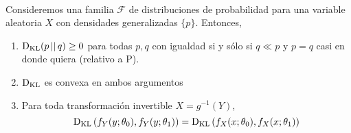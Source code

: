 \documentclass[main.tex]{subfiles}
\begin{document}
\begin{theorem} \ \\
Consideremos una familia $\mathcal{F}$ de distribuciones de probabilidad para una variable aleatoria $X$ con densidades generalizadas $\{p\}$. Entonces,
\begin{enumerate}[label=\roman*.]

\item $\operatorname*{D_{KL}}(p \operatorname*{\mid\mid} q) \geq 0$ para todas $p, q$ con igualdad si y sólo si $q \ll p$ y $p=q$ casi en donde quiera (relativo a P).
\item $\operatorname*{D_{KL}}$ es convexa en ambos argumentos
\item Para toda transformación invertible $X=g^{-1}(Y)$,
		\begin{equation*}
		\operatorname*{D_{KL}}\left(f_Y(y;\theta_0), f_Y(y;\theta_1)\right) =
		\operatorname*{D_{KL}}\left(f_X(x;\theta_0), f_X(x;\theta_1)\right) 
		\end{equation*}
\end{enumerate}
\end{theorem}
\end{document}
